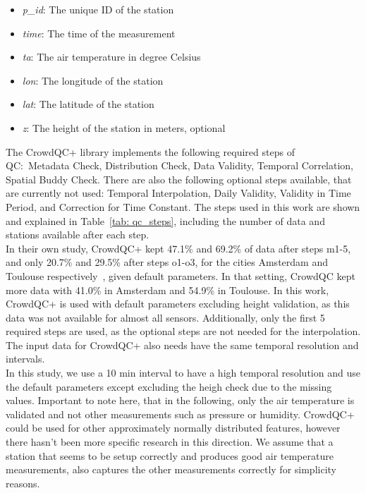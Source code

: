 \begin{itemize}
    \item \textit{p\_id}: The unique ID of the station
    \item \textit{time}: The time of the measurement
    \item \textit{ta}: The air temperature in degree Celsius
    \item \textit{lon}: The longitude of the station
    \item \textit{lat}: The latitude of the station
    \item \textit{z}: The height of the station in meters, optional
\end{itemize}

The CrowdQC+ library implements the following required steps of QC:\ Metadata Check, Distribution Check, Data Validity, Temporal Correlation, Spatial Buddy Check. There are also the following optional steps available, that are currently not used: Temporal Interpolation, Daily Validity, Validity in Time Period, and Correction for Time Constant.
The steps used in this work are shown and explained in Table~\ref{tab: qc_steps}, including the number of data and stations available after each step.\\
In their own study, CrowdQC+ kept 47.1\% and 69.2\% of data after steps m1-5, and only 20.7\% and 29.5\% after steps o1-o3, for the cities Amsterdam and Toulouse respectively~\cite{fenner2021crowdqc+}, given default parameters. In that setting, CrowdQC kept more data with 41.0\% in Amsterdam and 54.9\% in Toulouse. In this work, CrowdQC+ is used with default parameters excluding height validation, as this data was not available for almost all sensors. Additionally, only the first 5 required steps are used, as the optional steps are not needed for the interpolation. The input data for CrowdQC+ also needs have the same temporal resolution and intervals.\\
In this study, we use a 10 min interval to have a high temporal resolution and use the default parameters except excluding the heigh check due to the missing values. Important to note here, that in the following, only the air temperature is validated and not other measurements such as pressure or humidity. CrowdQC+ could be used for other approximately normally distributed features, however there hasn't been more specific research in this direction. We assume that a station that seems to be setup correctly and produces good air temperature measurements, also captures the other measurements correctly for simplicity reasons.

